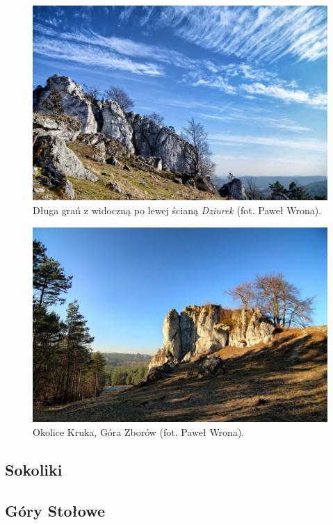 \documentclass{article}
\begin{document}
\begin{figure}[!htbp]
	\begin{center}
		\includegraphics[width=0.9\linewidth]{images/jura-gora-zborow.eps}
	\end{center}
	\caption{Długa grań z widoczną po lewej ścianą \textit{Dziurek} (fot. Paweł Wrona)\cite{jura-gora-zborow}.}
	\label{zborow}
\end{figure}

\begin{figure}[!htbp]
	\begin{center}
		\includegraphics[width=0.9\linewidth]{images/jura-gora-zborow-2.eps}
	\end{center}
	\caption{Okolice Kruka, Góra Zborów (fot. Paweł Wrona)\cite{jura-gora-zborow}.}
	\label{}
\end{figure}

\subsection{Sokoliki}

\subsection{Góry Stołowe}

\pagebreak
\nocite{*}
\printbibliography
\end{document}
